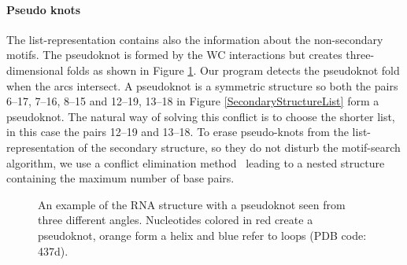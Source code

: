 \documentclass[12pt]{article}
\begin{document}
\paragraph{Pseudo knots}
The list-representation contains also the information about the non-secondary motifs. The pseudoknot is formed by the WC interactions but creates three-dimensional folds as shown in Figure \ref{PseudoKnot}. Our program detects the pseudoknot fold when the arcs intersect. A pseudoknot is a symmetric structure so both the pairs 6--17, 7--16, 8--15 and 12--19, 13--18 in Figure \ref{SecondaryStructureList} form a pseudoknot. 
The natural way of solving this conflict is to choose the shorter list, in this case the pairs 12--19 and 13--18.
To erase pseudo-knots from the list-representation of the
secondary structure, so they do not disturb the motif-search
algorithm, we use a conflict elimination method~\cite{Smit_2008} leading
to a nested structure containing the maximum number of base
pairs.
  
\begin{figure}[h!]
\begin{center}
\end{center}
\caption{An example of the RNA structure with a pseudoknot seen from three different angles. Nucleotides colored in red create a pseudoknot, orange form a helix and blue refer to loops (PDB code: 437d).}
\label{PseudoKnot}
\end{figure}
\newpage
\end{document}
